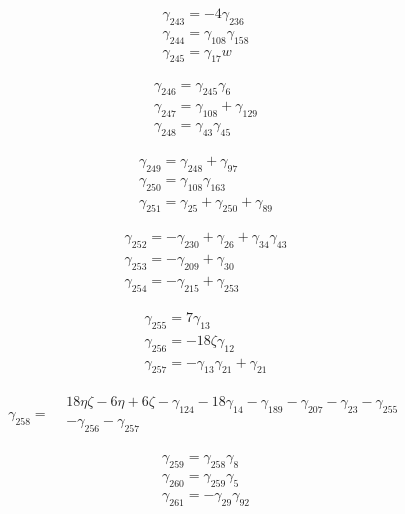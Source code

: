 \[\begin{aligned}\gamma_{243}=- 4 \gamma_{236}\\ \gamma_{244}=\gamma_{108} \gamma_{158}\\ \gamma_{245}=\gamma_{17} w\end{aligned}\]

\[\begin{aligned}\gamma_{246}=\gamma_{245} \gamma_{6}\\ \gamma_{247}=\gamma_{108} + \gamma_{129}\\ \gamma_{248}=\gamma_{43} \gamma_{45}\end{aligned}\]

\[\begin{aligned}\gamma_{249}=\gamma_{248} + \gamma_{97}\\ \gamma_{250}=\gamma_{108} \gamma_{163}\\ \gamma_{251}=\gamma_{25} + \gamma_{250} + \gamma_{89}\end{aligned}\]

\[\begin{aligned}\gamma_{252}=- \gamma_{230} + \gamma_{26} + \gamma_{34} \gamma_{43}\\ \gamma_{253}=- \gamma_{209} + \gamma_{30}\\ \gamma_{254}=- \gamma_{215} + \gamma_{253}\end{aligned}\]

\[\begin{aligned}\gamma_{255}=7 \gamma_{13}\\ \gamma_{256}=- 18 \zeta  \gamma_{12}\\ \gamma_{257}=- \gamma_{13} \gamma_{21} + \gamma_{21}\end{aligned}\]

\[\begin{aligned}\gamma_{258}=\begin{aligned}& 18 \eta  \zeta - 6 \eta + 6 \zeta - \gamma_{124}- 18 \gamma_{14}- \gamma_{189}- \gamma_{207}- \gamma_{23}- \gamma_{255}\\&- \gamma_{256}- \gamma_{257}\end{aligned}\end{aligned}\]

\[\begin{aligned}\gamma_{259}=\gamma_{258} \gamma_{8}\\ \gamma_{260}=\gamma_{259} \gamma_{5}\\ \gamma_{261}=- \gamma_{29} \gamma_{92}\end{aligned}\]

